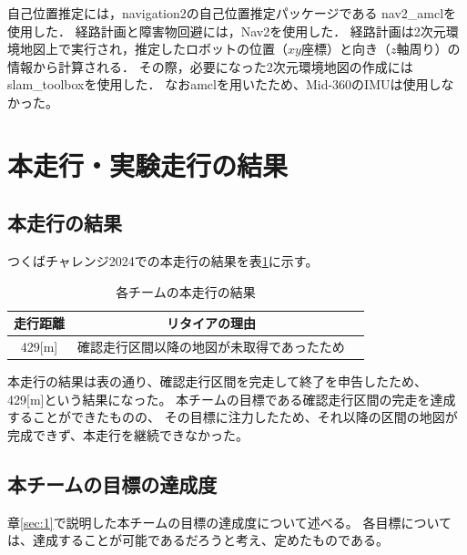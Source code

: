 \documentclass[twocolumn,9pt]{jsproceedings}
\begin{document}
自己位置推定には，navigation2の自己位置推定パッケージである
nav2\_amclを使用した\cite{nav2_amcl}．
経路計画と障害物回避には，Nav2を使用した\cite{nav2}．
経路計画は2次元環境地図上で実行され，推定したロボットの位置（$xy$座標）と向き（$z$軸周り）の情報から計算される．
その際，必要になった2次元環境地図の作成にはslam\_toolbox\cite{slam_toolbox}を使用した．
なおamclを用いたため、Mid-360のIMUは使用しなかった。

\section{本走行・実験走行の結果}
\subsection{本走行の結果}

つくばチャレンジ2024での本走行の結果を表\ref{MainRun}に示す。

\begin{table}[H]
  \caption{各チームの本走行の結果}
  \label{MainRun}
  \begin{tabular}{|c|c|p{4.0cm}|}
    \hline
    走行距離 & リタイアの理由                                                                                             \\
    \hline
    429[m]   & 確認走行区間以降の地図が未取得であったため                                                           \\
    \hline
  \end{tabular}
\end{table}

本走行の結果は表の通り、確認走行区間を完走して終了を申告したため、
429[m]という結果になった。
本チームの目標である確認走行区間の完走を達成することができたものの、
その目標に注力したため、それ以降の区間の地図が完成できず、本走行を継続できなかった。

\subsection{本チームの目標の達成度}

章\ref{sec:1}で説明した本チームの目標の達成度について述べる。
各目標については、達成することが可能であるだろうと考え、定めたものである。
\end{document}
